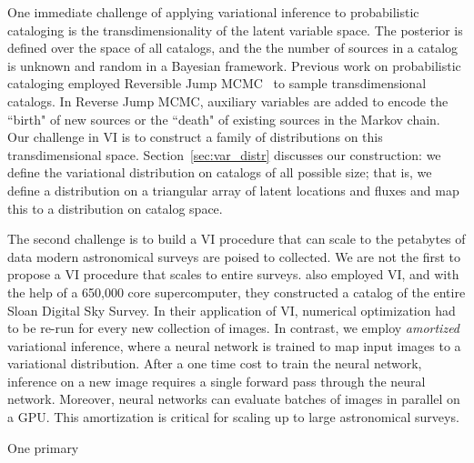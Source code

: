One immediate challenge of applying variational inference to probabilistic cataloging is the transdimensionality 
of the latent variable space. The posterior 
is defined over the space of all catalogs, and the the number of sources in a catalog is unknown and random in a Bayesian framework.
Previous work on probabilistic cataloging employed Reversible Jump MCMC~\cite{Green95reversiblejump} to sample transdimensional catalogs. In Reverse Jump MCMC, auxiliary variables are added to encode the ``birth" of new sources 
or the ``death" of existing sources in the Markov chain. Our challenge in VI is to construct a family of distributions on this transdimensional space. Section~\ref{sec:var_distr} discusses our construction: we define the variational distribution on catalogs of all possible size; that is, we define a distribution on a triangular array of latent locations and fluxes and map this to a distribution 
on catalog space.

The second challenge is to build a VI procedure 
that can scale to the petabytes of data 
modern astronomical surveys are poised to collected.
We are not the first to propose a VI procedure
that scales to entire surveys. 
\cite{regier2019_celeste} also employed 
VI, and with the help of a 650,000 core supercomputer, they constructed a catalog of the entire Sloan Digital Sky Survey. In their application of 
VI, numerical optimization had to be re-run for every new collection of images. 
In contrast, we employ {\itshape amortized} variational inference, where a neural network is trained to map input images to a variational distribution. After a one time cost to train the neural network, inference 
on a new image requires a single forward pass through the neural network. Moreover, neural networks can evaluate batches of images in parallel 
on a GPU. This amortization is critical for scaling up to large astronomical surveys. 

One primary 


